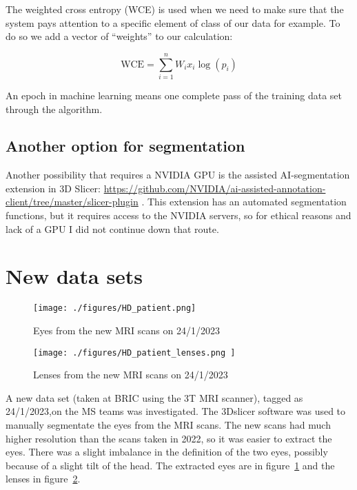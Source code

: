 \documentclass[12pt]{article}
\begin{document}
The weighted cross entropy (WCE) is used when we need to make sure
that the system pays attention to a specific element of class of our
data for example. To do so we add a vector of “weights” to our
calculation:

\begin{equation}
\mbox{WCE} = \sum_{i=1}^{n} W_i x_i \log(p_i)
\end{equation}

An epoch in machine learning means one complete pass of the training
data set through the algorithm.


\subsection{Another option for segmentation}

Another possibility that requires a NVIDIA GPU is the assisted
AI-segmentation extension in 3D Slicer:
\url{https://github.com/NVIDIA/ai-assisted-annotation-client/tree/master/slicer-plugin}
.
This extension has an automated segmentation functions, but it
requires access to the NVIDIA servers, so for ethical reasons and lack
of a GPU I did not continue down that route.


\section{New data sets}

\begin{figure}
\centering
\texttt{[image: ./figures/HD\_patient.png]} 
\caption{Eyes from the new MRI scans on 24/1/2023}
\label{fg:eyeHigh}
\end{figure}


\begin{figure}
\centering
\texttt{[image: ./figures/HD\_patient\_lenses.png ]} 
\caption{Lenses from the new MRI scans on 24/1/2023}
\label{fg:HDlenses}
\end{figure}



A new data set (taken at BRIC using the 3T MRI scanner), tagged as
24/1/2023,on the MS teams was investigated. The 3Dslicer software was
used to manually segmentate the eyes from the MRI scans. The new scans
had much higher resolution than the scans taken in 2022, so it was
easier to extract the eyes. There was a slight imbalance in the
definition of the two eyes, possibly because of a slight tilt of the
head. The extracted eyes are in figure~\ref{fg:eyeHigh} and the lenses
in figure~\ref{fg:HDlenses}.
\end{document}
